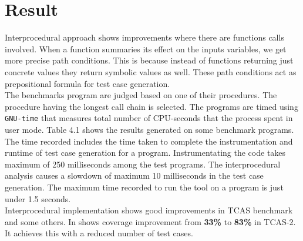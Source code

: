 \documentclass[12pt,oneside]{book}
\begin{document}
\section{Result}
 Interprocedural approach shows improvements where there are functions calls involved. When a function summaries its effect on the inputs variables, we get more precise path conditions. This is because instead of functions returning just concrete values they return symbolic values as well. These path conditions act as prepositional formula for test case generation. \\
The benchmarks program are judged based on one of their procedures. The procedure having the longest call chain is selected. The programs are timed using \texttt{GNU-time}\cite{time} that measures total number of CPU-seconds that the process spent in user mode. Table 4.1 shows the results generated on some benchmark programs. The time recorded includes the time taken to complete the instrumentation and runtime of test case generation for a program. Instrumentating the code takes maximum of 250 milliseconds among the test programs. The interprocedural analysis causes a slowdown of maximum 10 milliseconds in the test case generation. The maximum time recorded to run the tool on a program is just under 1.5 seconds.
\\

Interprocedural implementation shows good improvements in TCAS benchmark and some others. In shows coverage improvement from \textbf{33\%} to \textbf{83\%} in TCAS-2. It achieves this with a reduced number of test cases.  
\end{document}
